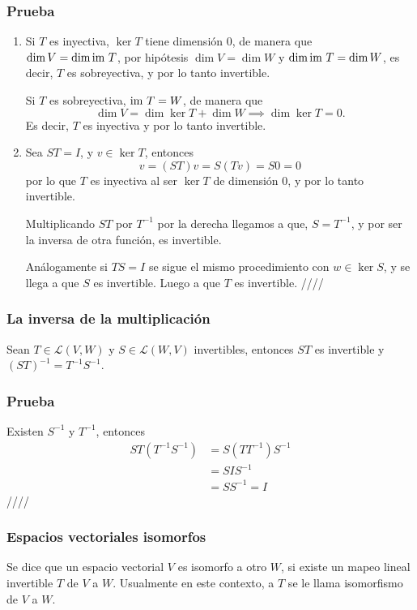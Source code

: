 \documentclass{article}
\begin{document}
\subsubsection*{Prueba}
\begin{enumerate}
    \item Si $T$ es inyectiva, $\ker T$ tiene dimensión $0$, de manera 
    que\\
    $\dim V = \dim \text{im } T$, por hipótesis $\dim V = \dim W$ y
    $\dim \text{im } T = \dim W$, es decir, $T$ es sobreyectiva, y por lo tanto
    invertible.
    
    Si $T$ es sobreyectiva, $\text{im } T = W$, de manera que
    $$\dim V = \dim \ker T + \dim W \implies \dim \ker T = 0.$$
    Es decir, $T$ es inyectiva y por lo tanto invertible.

    \item Sea $ST=I$, y $v\in\ker T$, entonces
    $$v = (ST)v = S(Tv) = S0 = 0$$
    por lo que $T$ es inyectiva al ser $\ker T$ de dimensión $0$,
    y por lo tanto invertible.

    Multiplicando $ST$ por $T^{-1}$ por la derecha llegamos a que,
    $S=T^{-1}$, y por ser la inversa de otra función, es invertible. 

    Análogamente si $TS=I$ se sigue el mismo procedimiento con
    $w\in\ker S$, y se llega a que $S$ es invertible. Luego a que $T$ 
    es invertible. \hfill ////
\end{enumerate}

\subsubsection{La inversa de la multiplicación}
Sean $T\in\mathcal{L}(V,W)$ y $S\in\mathcal{L}(W,V)$ invertibles, 
entonces $ST$ es invertible y $(ST)^{-1}=T^{-1}S^{-1}$.
\subsubsection*{Prueba}
Existen $S^{-1}$ y $T^{-1}$, entonces
\begin{align*}
    ST(T^{-1}S^{-1}) &= S(TT^{-1})S^{-1}\\
    &= SIS^{-1}\\
    &= SS^{-1} = I
\end{align*}
\hfill ////

\subsubsection{Espacios vectoriales isomorfos}
Se dice que un espacio vectorial $V$ es isomorfo a otro $W$,
si existe un mapeo lineal invertible $T$ de $V$ a $W$. Usualmente en 
este contexto, a $T$ se le llama isomorfismo de $V$ a $W$.
\end{document}
